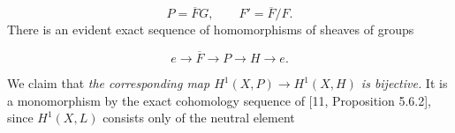 \[
P=\overline F G,\qquad F'=\overline F/F.
\]
There is an evident exact sequence of homomorphisms of sheaves of groups

\[
e\to\overline F\to P\to H
\to e.
\]

We claim that \textit{the corresponding map
$H^1(X,P)\to H^1(X,H)$ is bijective.} It is a monomorphism by the
exact cohomology sequence of [11, Proposition 5.6.2], since $H^1(X,L)$
consists only of the neutral element


